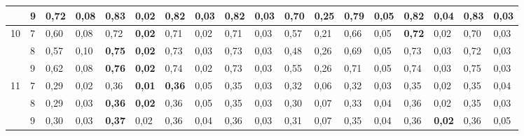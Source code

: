 \documentclass[conference]{IEEEtran}
\begin{document}
\begin{table*}[]
\begin{tabular}{|cl|ll|ll|ll|ll|ll|ll|ll|ll|}
		\multicolumn{1}{|c|}{} & 9 & \multicolumn{1}{l|}{0,72} & 0,08 & \multicolumn{1}{l|}{\textbf{0,83}} & \textbf{0,02} & \multicolumn{1}{l|}{0,82} & 0,03 & \multicolumn{1}{l|}{0,82} & 0,03 & \multicolumn{1}{l|}{0,70} & 0,25 & \multicolumn{1}{l|}{0,79} & 0,05 & \multicolumn{1}{l|}{0,82} & 0,04 & \multicolumn{1}{l|}{0,83} & 0,03 \\ \hline
		\multicolumn{1}{|c|}{\multirow{3}{*}{10}} & 7 & \multicolumn{1}{l|}{0,60} & 0,08 & \multicolumn{1}{l|}{0,72} & \textbf{0,02} & \multicolumn{1}{l|}{0,71} & 0,02 & \multicolumn{1}{l|}{0,71} & 0,03 & \multicolumn{1}{l|}{0,57} & 0,21 & \multicolumn{1}{l|}{0,66} & 0,05 & \multicolumn{1}{l|}{\textbf{0,72}} & 0,02 & \multicolumn{1}{l|}{0,70} & 0,03 \\ \cline{2-18} 
		\multicolumn{1}{|c|}{} & 8 & \multicolumn{1}{l|}{0,57} & 0,10 & \multicolumn{1}{l|}{\textbf{0,75}} & \textbf{0,02} & \multicolumn{1}{l|}{0,73} & 0,03 & \multicolumn{1}{l|}{0,73} & 0,03 & \multicolumn{1}{l|}{0,48} & 0,26 & \multicolumn{1}{l|}{0,69} & 0,05 & \multicolumn{1}{l|}{0,73} & 0,03 & \multicolumn{1}{l|}{0,72} & 0,03 \\ \cline{2-18} 
		\multicolumn{1}{|c|}{} & 9 & \multicolumn{1}{l|}{0,62} & 0,08 & \multicolumn{1}{l|}{\textbf{0,76}} & \textbf{0,02} & \multicolumn{1}{l|}{0,74} & 0,02 & \multicolumn{1}{l|}{0,73} & 0,03 & \multicolumn{1}{l|}{0,55} & 0,26 & \multicolumn{1}{l|}{0,71} & 0,05 & \multicolumn{1}{l|}{0,74} & 0,03 & \multicolumn{1}{l|}{0,75} & 0,03 \\ \hline
		\multicolumn{1}{|c|}{\multirow{3}{*}{11}} & 7 & \multicolumn{1}{l|}{0,29} & 0,02 & \multicolumn{1}{l|}{0,36} & \textbf{0,01} & \multicolumn{1}{l|}{\textbf{0,36}} & 0,05 & \multicolumn{1}{l|}{0,35} & 0,03 & \multicolumn{1}{l|}{0,32} & 0,06 & \multicolumn{1}{l|}{0,32} & 0,03 & \multicolumn{1}{l|}{0,35} & 0,02 & \multicolumn{1}{l|}{0,35} & 0,04 \\ \cline{2-18} 
		\multicolumn{1}{|c|}{} & 8 & \multicolumn{1}{l|}{0,29} & 0,03 & \multicolumn{1}{l|}{\textbf{0,36}} & \textbf{0,02} & \multicolumn{1}{l|}{0,36} & 0,05 & \multicolumn{1}{l|}{0,35} & 0,03 & \multicolumn{1}{l|}{0,30} & 0,07 & \multicolumn{1}{l|}{0,33} & 0,04 & \multicolumn{1}{l|}{0,36} & 0,02 & \multicolumn{1}{l|}{0,35} & 0,03 \\ \cline{2-18} 
		\multicolumn{1}{|c|}{} & 9 & \multicolumn{1}{l|}{0,30} & 0,03 & \multicolumn{1}{l|}{\textbf{0,37}} & 0,02 & \multicolumn{1}{l|}{0,36} & 0,04 & \multicolumn{1}{l|}{0,36} & 0,03 & \multicolumn{1}{l|}{0,31} & 0,07 & \multicolumn{1}{l|}{0,35} & 0,04 & \multicolumn{1}{l|}{0,36} & \textbf{0,02} & \multicolumn{1}{l|}{0,36} & 0,05 \\ \hline

\end{tabular}
\end{table*}
\end{document}

